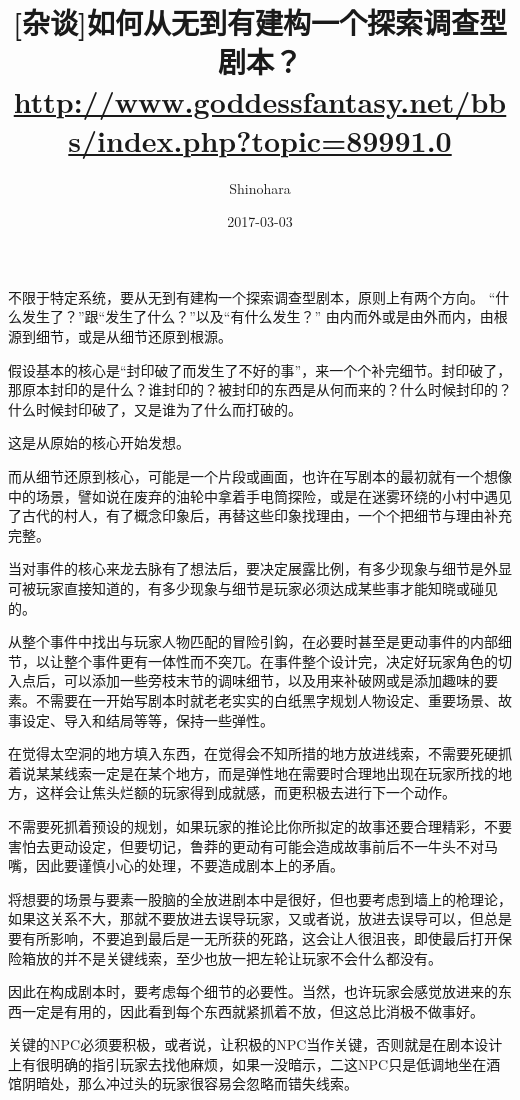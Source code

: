 \documentclass[a4paper,zihao=-4,notitlepage,twoside,openright]{ctexart}
\title{[杂谈]如何从无到有建构一个探索调查型剧本？\\
{\footnotesize \url{http://www.goddessfantasy.net/bbs/index.php?topic=89991.0}}}
\author{Shinohara}
\date{2017-03-03}
\begin{document}
\maketitle

不限于特定系统，要从无到有建构一个探索调查型剧本，原则上有两个方向。
“什么发生了？”跟“发生了什么？”以及“有什么发生？”
由内而外或是由外而内，由根源到细节，或是从细节还原到根源。

假设基本的核心是“封印破了而发生了不好的事”，来一个个补完细节。封印破了，那原本封印的是什么？谁封印的？被封印的东西是从何而来的？什么时候封印的？什么时候封印破了，又是谁为了什么而打破的。

这是从原始的核心开始发想。

而从细节还原到核心，可能是一个片段或画面，也许在写剧本的最初就有一个想像中的场景，譬如说在废弃的油轮中拿着手电筒探险，或是在迷雾环绕的小村中遇见了古代的村人，有了概念印象后，再替这些印象找理由，一个个把细节与理由补充完整。

当对事件的核心来龙去脉有了想法后，要决定展露比例，有多少现象与细节是外显可被玩家直接知道的，有多少现象与细节是玩家必须达成某些事才能知晓或碰见的。

从整个事件中找出与玩家人物匹配的冒险引鈎，在必要时甚至是更动事件的内部细节，以让整个事件更有一体性而不突兀。在事件整个设计完，决定好玩家角色的切入点后，可以添加一些旁枝末节的调味细节，以及用来补破网或是添加趣味的要素。不需要在一开始写剧本时就老老实实的白纸黑字规划人物设定、重要场景、故事设定、导入和结局等等，保持一些弹性。

在觉得太空洞的地方填入东西，在觉得会不知所措的地方放进线索，不需要死硬抓着说某某线索一定是在某个地方，而是弹性地在需要时合理地出现在玩家所找的地方，这样会让焦头烂额的玩家得到成就感，而更积极去进行下一个动作。

不需要死抓着预设的规划，如果玩家的推论比你所拟定的故事还要合理精彩，不要害怕去更动设定，但要切记，鲁莽的更动有可能会造成故事前后不一牛头不对马嘴，因此要谨慎小心的处理，不要造成剧本上的矛盾。

将想要的场景与要素一股脑的全放进剧本中是很好，但也要考虑到墙上的枪理论，如果这关系不大，那就不要放进去误导玩家，又或者说，放进去误导可以，但总是要有所影响，不要追到最后是一无所获的死路，这会让人很沮丧，即使最后打开保险箱放的并不是关键线索，至少也放一把左轮让玩家不会什么都没有。

因此在构成剧本时，要考虑每个细节的必要性。当然，也许玩家会感觉放进来的东西一定是有用的，因此看到每个东西就紧抓着不放，但这总比消极不做事好。

关键的NPC必须要积极，或者说，让积极的NPC当作关键，否则就是在剧本设计上有很明确的指引玩家去找他麻烦，如果一没暗示，二这NPC只是低调地坐在酒馆阴暗处，那么冲过头的玩家很容易会忽略而错失线索。
\end{document}
